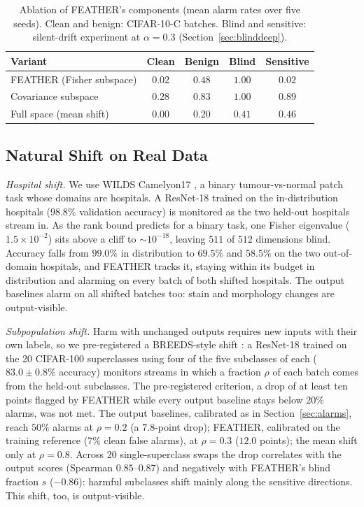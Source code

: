\documentclass[conference]{IEEEtran}
\begin{document}
\begin{table}[t]
\caption{Ablation of FEATHER's components (mean alarm rates over five seeds).
Clean and benign: CIFAR-10-C batches. Blind and sensitive: silent-drift
experiment at $\alpha=0.3$ (Section~\ref{sec:blinddeep}).}
\label{tab:ablation}
\centering
\footnotesize
\setlength{\tabcolsep}{4pt}
\begin{tabular}{lcccc}
\hline
Variant & Clean & Benign & Blind & Sensitive \\
\hline
FEATHER (Fisher subspace) & $0.02$ & $0.48$ & $\mathbf{1.00}$ & $\mathbf{0.02}$ \\
Covariance subspace & $0.28$ & $0.83$ & $1.00$ & $0.89$ \\
Full space (mean shift) & $0.00$ & $0.20$ & $0.41$ & $0.46$ \\
\hline
\end{tabular}
\end{table}

\subsection{Natural Shift on Real Data}
\label{sec:wilds}

\textit{Hospital shift.} We use WILDS Camelyon17 \cite{koh2021wilds}, a binary
tumour-vs-normal patch task whose domains are hospitals. A ResNet-18 trained on
the in-distribution hospitals ($98.8\%$ validation accuracy) is monitored as
the two held-out hospitals stream in. As the rank bound predicts for a binary
task, one Fisher eigenvalue ($1.5\times10^{-2}$) sits above a cliff to
$\sim10^{-18}$, leaving $511$ of $512$ dimensions blind. Accuracy falls from
$99.0\%$ in distribution to $69.5\%$ and $58.5\%$ on the two out-of-domain
hospitals, and FEATHER tracks it, staying within its budget in distribution
and alarming on every batch of both shifted hospitals. The output baselines
alarm on all shifted batches too: stain and morphology changes are
output-visible.

\textit{Subpopulation shift.} Harm with unchanged outputs requires new inputs
with their own labels, so we pre-registered a BREEDS-style shift
\cite{santurkar2021breeds}: a ResNet-18 trained on the 20 CIFAR-100
superclasses using four of the five subclasses of each ($83.0 \pm 0.8\%$
accuracy) monitors streams in which a fraction $\rho$ of each batch comes from
the held-out subclasses. The pre-registered criterion, a drop of at least ten
points flagged by FEATHER while every output baseline stays below $20\%$
alarms, was not met. The output baselines, calibrated as in
Section~\ref{sec:alarms}, reach $50\%$ alarms at $\rho = 0.2$ (a $7.8$-point
drop); FEATHER, calibrated on the training reference ($7\%$ clean false
alarms), at $\rho = 0.3$ ($12.0$ points); the mean shift only at $\rho = 0.8$.
Across 20 single-superclass swaps the drop correlates with the output scores
(Spearman $0.85$--$0.87$) and negatively with FEATHER's blind fraction $s$
($-0.86$): harmful subclasses shift mainly along the sensitive directions. This
shift, too, is output-visible.
\end{document}
